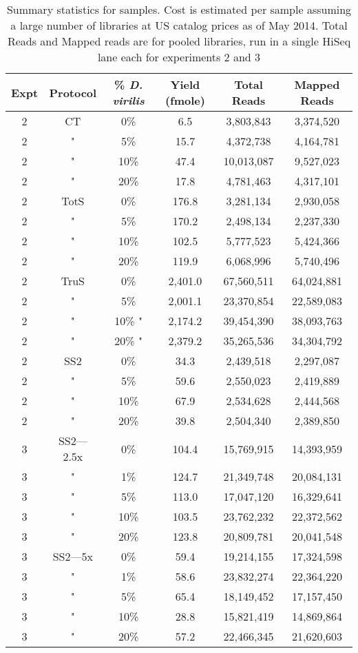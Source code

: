 \begin{table}[htdp]

\caption{Summary statistics for samples. Cost is estimated per sample assuming a
     large number of libraries at US catalog prices as of May 2014. Total Reads
     and Mapped reads are for pooled libraries, run in a single HiSeq lane each
     for experiments 2 and 3}
\begin{center}
\begin{tabular}{|c|c|c|c|c|c|} \hline
Expt & Protocol & \% {\em D. virilis}  &  Yield (fmole) & Total Reads & Mapped Reads \\\hline 
2 & CT & 0\%  & 6.5  & 3,803,843 &3,374,520 \\
2 & " & 5\%  & 15.7  & 4,372,738 &4,164,781 \\
2 & " & 10\%  & 47.4  & 10,013,087 &9,527,023 \\
2 & " & 20\%  & 17.8  & 4,781,463 &4,317,101 \\
2 & TotS & 0\%  & 176.8  & 3,281,134 &2,930,058 \\
2 & " & 5\%  & 170.2  & 2,498,134 &2,237,330 \\
2 & " & 10\%  & 102.5  & 5,777,523 &5,424,366 \\
2 & " & 20\%  & 119.9  & 6,068,996 &5,740,496 \\
2 & TruS & 0\%  & 2,401.0  & 67,560,511 &64,024,881 \\
2 & " & 5\%  & 2,001.1  & 23,370,854 &22,589,083 \\
2 & " & 10\% " & 2,174.2  & 39,454,390 &38,093,763 \\
2 & " & 20\% " & 2,379.2  & 35,265,536 &34,304,792 \\
2 & SS2 & 0\% & 34.3  & 2,439,518 &2,297,087 \\
2 & " & 5\% & 59.6  & 2,550,023 &2,419,889 \\
2 & " & 10\% & 67.9  & 2,534,628 &2,444,568 \\
2 & " & 20\% & 39.8  & 2,504,340 &2,389,850 \\
3 & SS2---2.5x & 0\% & 104.4  & 15,769,915 &14,393,959 \\
3 & " & 1\% & 124.7  & 21,349,748 &20,084,131 \\
3 & " & 5\% & 113.0  & 17,047,120 &16,329,641 \\
3 & " & 10\% & 103.5  & 23,762,232 &22,372,562 \\
3 & " & 20\% & 123.8  & 20,809,781 &20,041,548 \\
3 & SS2---5x & 0\% & 59.4  & 19,214,155 &17,324,598 \\
3 & " & 1\% & 58.6  & 23,832,274 &22,364,220 \\
3 & " & 5\% & 65.4  & 18,149,452 &17,157,450 \\
3 & " & 10\% & 28.8  & 15,821,419 &14,869,864 \\
3 & " & 20\% & 57.2  & 22,466,345 &21,620,603 \\\hline

\end{tabular}
\label{tab:protocols}
\end{center}
\end{table}
      